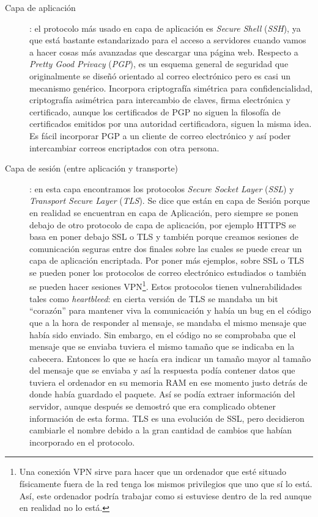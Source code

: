 \documentclass[10pt,a4paper,spanish]{report}
\begin{document}
\begin{description}
  \item[Capa de aplicación]: el protocolo más usado en capa de aplicación es \textcolor{tema2}{\textit{Secure Shell}} (\textcolor{tema2}{\textit{SSH}}), ya que está bastante estandarizado para el acceso a servidores cuando vamos a hacer cosas más avanzadas que descargar una página web. Respecto a \textcolor{tema2}{\textit{Pretty Good Privacy}} (\textcolor{tema2}{\textit{PGP}}), es un esquema general de seguridad que originalmente se diseñó orientado al correo electrónico pero es casi un mecanismo genérico. Incorpora criptografía simétrica para confidencialidad, criptografía asimétrica para intercambio de claves, firma electrónica y certificado, aunque los certificados de PGP no siguen la filosofía de certificados emitidos por una autoridad certificadora, siguen la misma idea. Es fácil incorporar PGP a un cliente de correo electrónico y así poder intercambiar correos encriptados con otra persona.
  \item[Capa de sesión (entre aplicación y transporte)]: en esta capa encontramos los protocolos \textit{\textcolor{tema2}{Secure Socket Layer}} (\textit{\textcolor{tema2}{SSL}}) y \textit{\textcolor{tema2}{Transport Secure Layer}} (\textit{\textcolor{tema2}{TLS}}). Se dice que están en capa de Sesión porque en realidad se encuentran en capa de Aplicación, pero siempre se ponen debajo de otro protocolo de capa de aplicación, por ejemplo HTTPS se basa en poner debajo SSL o TLS y también porque creamos sesiones de comunicación seguras entre dos finales sobre las cuales se puede crear un capa de aplicación encriptada. Por poner más ejemplos, sobre SSL o TLS se pueden poner los protocolos de correo electrónico estudiados o también se pueden hacer sesiones VPN\footnote{Una conexión VPN sirve para hacer que un ordenador que esté situado físicamente fuera de la red tenga los mismos privilegios que uno que sí lo está. Así, este ordenador podría trabajar como si estuviese dentro de la red aunque en realidad no lo está.}. Estos protocolos tienen vulnerabilidades tales como \textcolor{tema2}{\textit{heartbleed}}: en cierta versión de TLS se mandaba un bit ``corazón'' para mantener viva la comunicación y había un bug en el código que a la hora de responder al mensaje, se mandaba el mismo mensaje que había sido enviado. Sin embargo, en el código no se comprobaba que el mensaje que se enviaba tuviera el mismo tamaño que se indicaba en la cabecera. Entonces lo que se hacía era indicar un tamaño mayor al tamaño del mensaje que se enviaba y así la respuesta podía contener datos que tuviera el ordenador en su memoria RAM en ese momento justo detrás de donde había guardado el paquete. Así se podía extraer información del servidor, aunque después se demostró que era complicado obtener información de esta forma. TLS es una evolución de SSL, pero decidieron cambiarle el nombre debido a la gran cantidad de cambios que habían incorporado en el protocolo.

\end{description}
\end{document}
